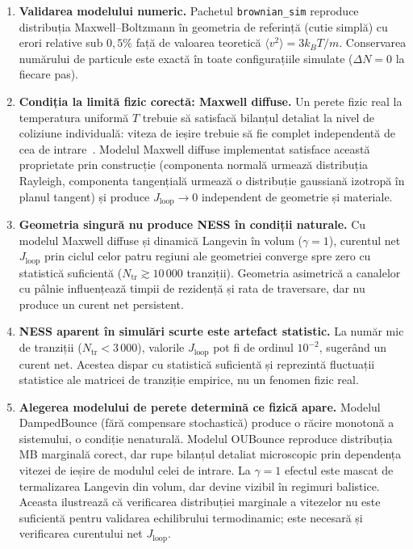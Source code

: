 \documentclass[12pt,openright,twoside]{book}
\begin{document}
\begin{enumerate}[label=\arabic*.]
    \item \textbf{Validarea modelului numeric.} Pachetul \texttt{brownian\_sim} reproduce distribuția Maxwell--Boltzmann în geometria de referință (cutie simplă) cu erori relative sub $0{,}5\%$ față de valoarea teoretică $\langle v^2 \rangle = 3k_BT/m$. Conservarea numărului de particule este exactă în toate configurațiile simulate ($\Delta N = 0$ la fiecare pas).

    \item \textbf{Condiția la limită fizic corectă: Maxwell diffuse.} Un perete fizic real la temperatura uniformă $T$ trebuie să satisfacă bilanțul detaliat la nivel de coliziune individuală: viteza de ieșire trebuie să fie complet independentă de cea de intrare~\cite{cercignani1971,maes2021}. Modelul Maxwell diffuse implementat satisface această proprietate prin construcție (componenta normală urmează distribuția Rayleigh, componenta tangențială urmează o distribuție gaussiană izotropă în planul tangent) și produce $J_\text{loop} \to 0$ independent de geometrie și materiale.

    \item \textbf{Geometria singură nu produce NESS în condiții naturale.} Cu modelul Maxwell diffuse și dinamică Langevin în volum ($\gamma = 1$), curentul net $J_\text{loop}$ prin ciclul celor patru regiuni ale geometriei converge spre zero cu statistică suficientă ($N_\text{tr} \gtrsim 10\,000$ tranziții). Geometria asimetrică a canalelor cu pâlnie influențează timpii de rezidență și rata de traversare, dar nu produce un curent net persistent.

    \item \textbf{NESS aparent în simulări scurte este artefact statistic.} La număr mic de tranziții ($N_\text{tr} < 3\,000$), valorile $J_\text{loop}$ pot fi de ordinul $10^{-2}$, sugerând un curent net. Acestea dispar cu statistică suficientă și reprezintă fluctuații statistice ale matricei de tranziție empirice, nu un fenomen fizic real.

    \item \textbf{Alegerea modelului de perete determină ce fizică apare.} Modelul DampedBounce (fără compensare stochastică) produce o răcire monotonă a sistemului, o condiție nenaturală. Modelul OUBounce reproduce distribuția MB marginală corect, dar rupe bilanțul detaliat microscopic prin dependența vitezei de ieșire de modulul celei de intrare. La $\gamma = 1$ efectul este mascat de termalizarea Langevin din volum, dar devine vizibil în regimuri balistice. Aceasta ilustrează că verificarea distribuției marginale a vitezelor nu este suficientă pentru validarea echilibrului termodinamic; este necesară și verificarea curentului net $J_\text{loop}$.
\end{enumerate}
\end{document}
